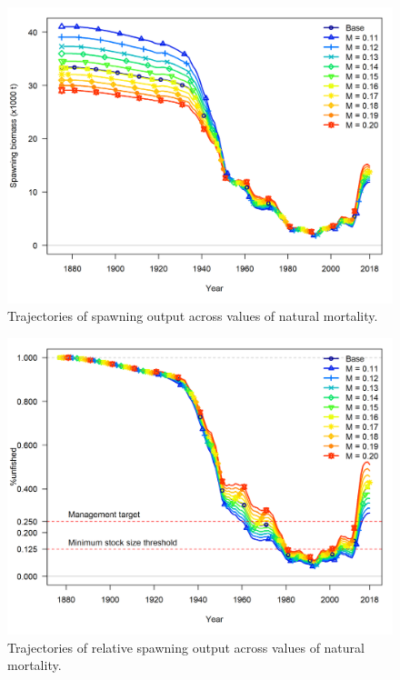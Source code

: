 \documentclass[12pt,]{article}
\begin{document}
\FloatBarrier

\begin{figure}
\centering
\includegraphics{Figures/m_trajectories_ssb.png}
\caption{Trajectories of spawning output across values of natural
mortality. \label{fig:m_ssb_trajectory}}
\end{figure}

\FloatBarrier

\begin{figure}
\centering
\includegraphics{Figures/m_trajectories_depl.png}
\caption{Trajectories of relative spawning output across values of
natural mortality. \label{fig:m_depl_trajectory}}
\end{figure}
\end{document}
